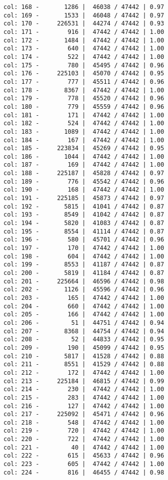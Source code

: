 \documentclass[11pt]{article}
\begin{document}
\begin{Verbatim}[commandchars=\\\{\}]
col: 168 -       1286 |  46038 / 47442 | 0.97
col: 169 -       1533 |  46048 / 47442 | 0.97
col: 170 -     226531 |  44274 / 47442 | 0.93
col: 171 -        916 |  47442 / 47442 | 1.00
col: 172 -       1484 |  47442 / 47442 | 1.00
col: 173 -        640 |  47442 / 47442 | 1.00
col: 174 -        522 |  47442 / 47442 | 1.00
col: 175 -        780 |  45495 / 47442 | 0.96
col: 176 -     225103 |  45070 / 47442 | 0.95
col: 177 -        777 |  45511 / 47442 | 0.96
col: 178 -       8367 |  47442 / 47442 | 1.00
col: 179 -        778 |  45520 / 47442 | 0.96
col: 180 -        779 |  45559 / 47442 | 0.96
col: 181 -        171 |  47442 / 47442 | 1.00
col: 182 -        524 |  47442 / 47442 | 1.00
col: 183 -       1089 |  47442 / 47442 | 1.00
col: 184 -        167 |  47442 / 47442 | 1.00
col: 185 -     223834 |  45269 / 47442 | 0.95
col: 186 -       1044 |  47442 / 47442 | 1.00
col: 187 -        169 |  47442 / 47442 | 1.00
col: 188 -     225187 |  45828 / 47442 | 0.97
col: 189 -        776 |  45542 / 47442 | 0.96
col: 190 -        168 |  47442 / 47442 | 1.00
col: 191 -     225185 |  45873 / 47442 | 0.97
col: 192 -       5815 |  41041 / 47442 | 0.87
col: 193 -       8549 |  41042 / 47442 | 0.87
col: 194 -       5820 |  41083 / 47442 | 0.87
col: 195 -       8554 |  41114 / 47442 | 0.87
col: 196 -        580 |  45701 / 47442 | 0.96
col: 197 -        170 |  47442 / 47442 | 1.00
col: 198 -        604 |  47442 / 47442 | 1.00
col: 199 -       8553 |  41187 / 47442 | 0.87
col: 200 -       5819 |  41184 / 47442 | 0.87
col: 201 -     225664 |  46596 / 47442 | 0.98
col: 202 -       1126 |  45596 / 47442 | 0.96
col: 203 -        165 |  47442 / 47442 | 1.00
col: 204 -        660 |  47442 / 47442 | 1.00
col: 205 -        166 |  47442 / 47442 | 1.00
col: 206 -         51 |  44751 / 47442 | 0.94
col: 207 -       8368 |  44754 / 47442 | 0.94
col: 208 -         52 |  44833 / 47442 | 0.95
col: 209 -        190 |  45099 / 47442 | 0.95
col: 210 -       5817 |  41528 / 47442 | 0.88
col: 211 -       8551 |  41529 / 47442 | 0.88
col: 212 -        172 |  47442 / 47442 | 1.00
col: 213 -     225184 |  46815 / 47442 | 0.99
col: 214 -        230 |  47442 / 47442 | 1.00
col: 215 -        283 |  47442 / 47442 | 1.00
col: 216 -        127 |  47442 / 47442 | 1.00
col: 217 -     225092 |  45471 / 47442 | 0.96
col: 218 -        548 |  47442 / 47442 | 1.00
col: 219 -        720 |  47442 / 47442 | 1.00
col: 220 -        722 |  47442 / 47442 | 1.00
col: 221 -         40 |  47442 / 47442 | 1.00
col: 222 -        615 |  45633 / 47442 | 0.96
col: 223 -        605 |  47442 / 47442 | 1.00
col: 224 -        816 |  46455 / 47442 | 0.98

\end{Verbatim}
\end{document}
